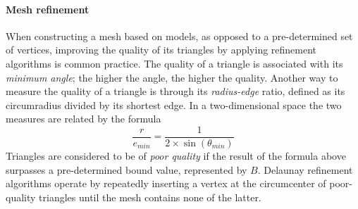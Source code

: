 \paragraph{Mesh refinement} When constructing a mesh based on models, as opposed to a pre-determined set of vertices, improving the quality of its triangles by applying refinement algorithms is common practice. The quality of a triangle is associated with its \textit{minimum angle}; the higher the angle, the higher the quality. Another way to measure the quality of a triangle is through its \textit{radius-edge} ratio, defined as its circumradius divided by its shortest edge. In a two-dimensional space the two measures are related by the formula
\begin{equation*}
\dfrac{r}{e_{min}} = \dfrac{1}{2 \times \sin(\theta_{min})}
\end{equation*}
Triangles are considered to be of \textit{poor quality} if the result of the formula above surpasses a pre-determined bound value, represented by $B$. Delaunay refinement algorithms operate by repeatedly inserting a vertex at the circumcenter of poor-quality triangles until the mesh contains none of the latter.

